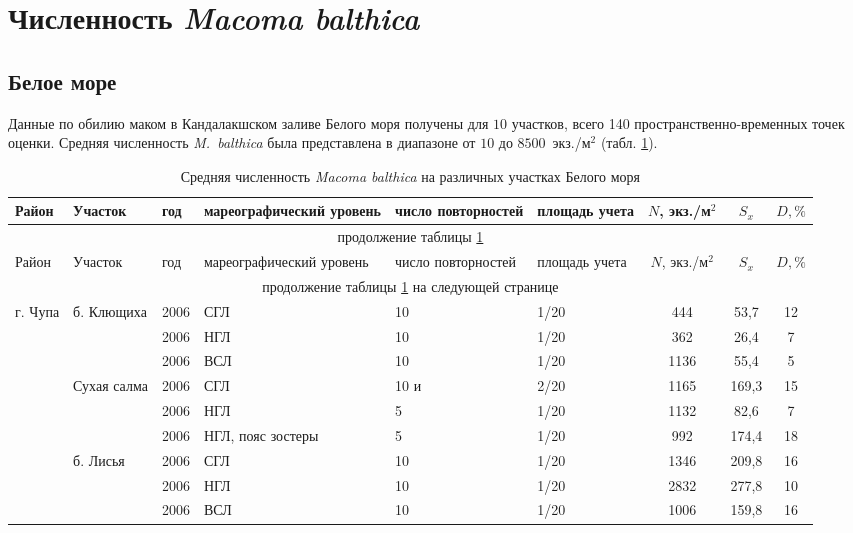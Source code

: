 \documentclass[12pt, a4paper]{disser}
\begin{document}
	\section{Численность {\it Macoma balthica}}
	\subsection{Белое море}
Данные по обилию маком в Кандалакшском заливе Белого моря получены для $10$ участков, всего 140 пространственно-временных точек оценки.
Средняя численность {\it M.~balthica} была представлена в диапазоне от $10$ до $8500$~экз./м$^2$ (табл. \ref{tab:mean_N_White}).
	\begin{footnotesize}
	\begin{longtable}{|p{2cm}|p{3cm}|p{1cm}|p{2cm}|p{1.5cm}|p{1cm}|*{3}{c|}}
	\caption{Средняя численность {\it Macoma balthica} на различных участках Белого моря}\label{tab:mean_N_White}\\
	\hline
	Район & Участок & год & ма\-ре\-ографи\-ческий уровень & число повторностей & площадь учета & $N$, экз./м$^2$ & $S_x$  & $D, \%$ 
	\\ \hline \endfirsthead
	\hline
	\multicolumn{9}{|c|}{продолжение таблицы \ref{tab:mean_N_White}} \\ \hline
	Район & Участок & год & ма\-ре\-ографи\-ческий уровень & число повторностей & площадь учета & $N$, экз./м$^2$ & $S_x$  & $D, \%$ 
	\\ \hline \endhead
	\hline 
	\multicolumn{9}{|c|}{продолжение таблицы \ref{tab:mean_N_White} на следующей странице}
	\\ \hline \endfoot
	 \endlastfoot
	г. Чупа & б. Клющиха & 2006 & СГЛ & 10 & 1/20 & 444 & 53,7 & 12
		\\ \cline{3-9}
		 &  & 2006 & НГЛ & 10 & 1/20 & 362 & 26,4 & 7
		\\ \cline{3-9}
		 &  & 2006 & ВСЛ & 10 & 1/20 & 1136 & 55,4 & 5
		\\ \cline{2-9}
		 & Сухая салма & 2006 & СГЛ & 10 и & 2/20 & 1165 & 169,3 & 15
		\\ \cline{3-9}
		 &  & 2006 & НГЛ & 5 & 1/20 & 1132 & 82,6 & 7
		\\ \cline{3-9}
		 &  & 2006 & НГЛ, пояс зостеры & 5 & 1/20 & 992 & 174,4 & 18
		\\ \cline{2-9}
		 & б. Лисья & 2006 & СГЛ & 10 & 1/20 & 1346 & 209,8 & 16
		\\ \cline{3-9}
		 &  & 2006 & НГЛ & 10 & 1/20 & 2832 & 277,8 & 10
		\\ \cline{3-9}
		 &  & 2006 & ВСЛ & 10 & 1/20 & 1006 & 159,8 & 16

\end{longtable}
\end{footnotesize}
\end{document}
